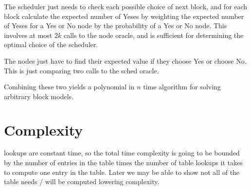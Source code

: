 \documentclass{article}
\begin{document}
The scheduler just needs to check each possible choice of next block,
and for each block calculate the expected number of Yeses by weighting
the expected number of Yeses for a Yes or No node by the probability
of a Yes or No node. This involves at most $2k$ calls to the node
oracle, and is sufficient for determining the optimal choice of the
scheduler.

The nodes just have to find their expected value if they choose Yes or
choose No. This is just comparing two calls to the sched oracle.

Combining these two yields a polynomial in $n$ time algorithm for
solving arbitrary block models.

\section{Complexity}

lookups are constant time, so the total time complexity is going to
be bounded by the number of entries in the table times the number of
table lookups it takes to compute one entry in the table. Later we may
be able to show not all of the table needs / will be computed lowering
complexity.
\end{document}
